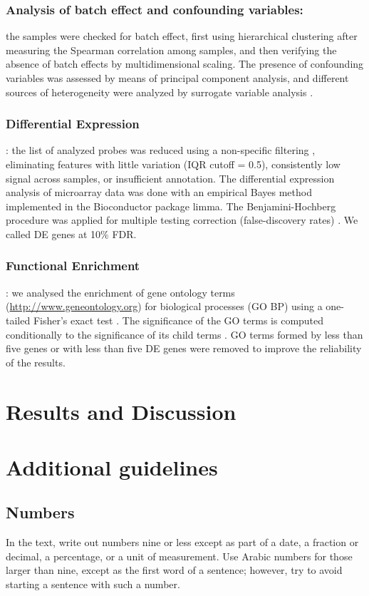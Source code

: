 \documentclass[9pt,twocolumn,twoside]{gsajnl}
\begin{document}
\subsubsection*{Analysis of batch effect and confounding variables:}
the samples were checked for batch effect, first using hierarchical clustering after measuring the Spearman correlation among samples, and then verifying the absence of batch effects by multidimensional scaling. The presence of confounding variables was assessed by means of principal component analysis, and different sources of heterogeneity were analyzed by surrogate variable analysis \citep{Leek2007}.

\subsubsection*{Differential Expression}: the list of analyzed probes was reduced using a non-specific filtering \citep{Bourgon2010}, eliminating features with little variation (IQR cutoff = 0.5), consistently low signal across samples, or insufficient annotation. The differential expression analysis of microarray data was done with an empirical Bayes method \citep{Smyth2004} implemented in the Bioconductor package limma. The Benjamini-Hochberg procedure was applied for multiple testing correction (false-discovery rates) \citep{Benjamini1995}. We called DE genes at 10\% FDR.

\subsubsection*{Functional Enrichment}: we analysed the enrichment of gene ontology terms (\url{http://www.geneontology.org}) for biological processes (GO BP) using a one-tailed Fisher's exact test \citep{Fisher1922}. The significance of the GO terms is computed conditionally to the significance of its child terms \citep{Alexa2006}. GO terms formed by less than five genes or with less than five DE genes were removed to improve the reliability of the results.

\section*{Results and Discussion}


\section*{Additional guidelines}

\subsection*{Numbers} In the text, write out numbers nine or less except as part of a date, a fraction or decimal, a percentage, or a unit of measurement. Use Arabic numbers for those larger than nine, except as the first word of a sentence; however, try to avoid starting a sentence with such a number.
\end{document}
